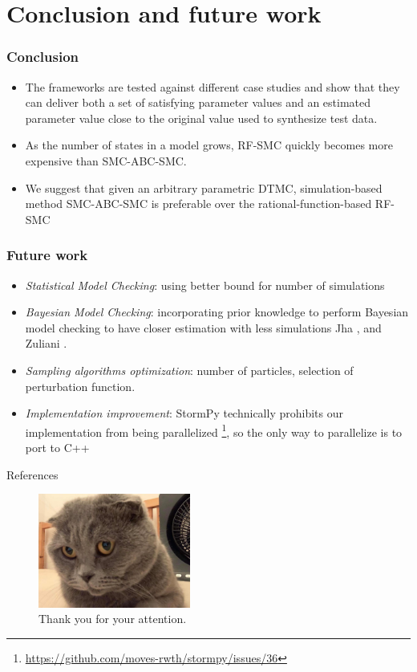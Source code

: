 \documentclass{beamer}
\begin{document}
\section{Conclusion and future work}
\begin{frame}
    \frametitle{Conclusion}
    \begin{itemize}
        \item The frameworks are tested against different case studies and show that they can
              deliver both a set of satisfying parameter values and an estimated parameter value
              close to the original value used to synthesize test data.
        \item As the number of states in a model grows, RF-SMC quickly becomes more expensive than
        SMC-ABC-SMC.
        \item We suggest that given an arbitrary parametric DTMC, simulation-based method
              SMC-ABC-SMC is preferable over the rational-function-based RF-SMC
    \end{itemize}
\end{frame}

\begin{frame}
    \frametitle{Future work}
    \begin{itemize}
        \item \textit{Statistical Model Checking}: using better bound for number of simulations
        \cite{molyneux2020abc}
        \item \textit{Bayesian Model Checking}: incorporating prior knowledge to perform Bayesian
              model checking to have closer estimation with less simulations Jha
              \cite{jha2009bayesian}, and Zuliani \cite{zuliani2013bayesian}.
        \item \textit{Sampling algorithms optimization}: number of particles, selection of
        perturbation function.
        \item \textit{Implementation improvement}: StormPy technically prohibits our implementation
              from being parallelized
              \footnote{\url{https://github.com/moves-rwth/stormpy/issues/36}}, so the only way to
              parallelize is to port to C++
    \end{itemize}
\end{frame}

\begin{frame}[allowframebreaks]{References}
    \printbibliography
\end{frame}

\begin{frame}

    \begin{figure}[H]
        \includegraphics[width=5cm]{figures/cat.jpeg}
        \caption{Thank you for your attention.}
    \end{figure}
\end{frame}
\end{document}

